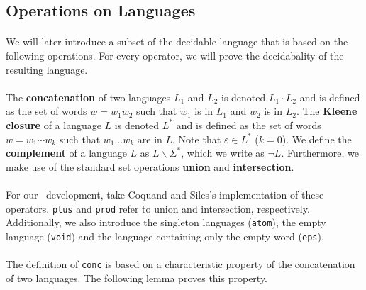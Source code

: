     \subsection{Operations on Languages}

    \paragraph{}
    We will later introduce a subset of the decidable language that is based on the following operations. For every operator, we will prove the decidabality of the resulting language.

    \paragraph{}

    The \textbf{concatenation} of two languages $L_1$ and $L_2$ is denoted $L_1 \cdot L_2$ and is defined as the set of words $w = w_1 w_2$ such that $w_1$ is in $L_1$ and $w_2$ is in $L_2$.
    The \textbf{Kleene closure} of a language $L$ is denoted $L^*$ and is defined as the set of words $w = w_1 \cdots w_k$ such that $w_1 \ldots w_k$ are in $L$. 
    Note that $\varepsilon \in L^*$ ($k=0$).
    We define the \textbf{complement} of a language $L$ as $L \backslash \Sigma^*$, which we write as $\neg L$.
    Furthermore, we make use of the standard set operations \textbf{union} and \textbf{intersection}.

    \paragraph{}
    For our \coq\ development,
    take Coquand and Siles's \cite{DBLP:conf/cpp/CoquandS11} implementation of these operators. 
    \lstinline{plus} and \lstinline{prod} refer to union and intersection, respectively. 
    Additionally, we also introduce the singleton languages (\lstinline{atom}), the empty language (\lstinline{void}) and the language containing only the empty word (\lstinline{eps}).


    \paragraph{}
    The definition of \lstinline{conc} is based on a characteristic property of the concatenation of two languages. The following lemma proves this property.

